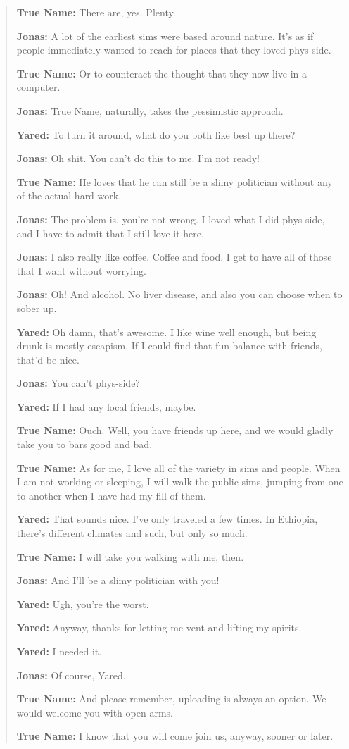 \begin{quote}
\textbf{True Name:} There are, yes. Plenty.

\textbf{Jonas:} A lot of the earliest sims were based around nature. It's as if people immediately wanted to reach for places that they loved phys-side.

\textbf{True Name:} Or to counteract the thought that they now live in a computer.

\textbf{Jonas:} True Name, naturally, takes the pessimistic approach.

\textbf{Yared:} To turn it around, what do you both like best up there?

\textbf{Jonas:} Oh shit. You can't do this to me. I'm not ready!

\textbf{True Name:} He loves that he can still be a slimy politician without any of the actual hard work.

\textbf{Jonas:} The problem is, you're not wrong. I loved what I did phys-side, and I have to admit that I still love it here.

\textbf{Jonas:} I also really like coffee. Coffee and food. I get to have all of those that I want without worrying.

\textbf{Jonas:} Oh! And alcohol. No liver disease, and also you can choose when to sober up.

\textbf{Yared:} Oh damn, that's awesome. I like wine well enough, but being drunk is mostly escapism. If I could find that fun balance with friends, that'd be nice.

\textbf{Jonas:} You can't phys-side?

\textbf{Yared:} If I had any local friends, maybe.

\textbf{True Name:} Ouch. Well, you have friends up here, and we would gladly take you to bars good and bad.

\textbf{True Name:} As for me, I love all of the variety in sims and people. When I am not working or sleeping, I will walk the public sims, jumping from one to another when I have had my fill of them.

\textbf{Yared:} That sounds nice. I've only traveled a few times. In Ethiopia, there's different climates and such, but only so much.

\textbf{True Name:} I will take you walking with me, then.

\textbf{Jonas:} And I'll be a slimy politician with you!

\textbf{Yared:} Ugh, you're the worst.

\textbf{Yared:} Anyway, thanks for letting me vent and lifting my spirits.

\textbf{Yared:} I needed it.

\textbf{Jonas:} Of course, Yared.

\textbf{True Name:} And please remember, uploading is always an option. We would welcome you with open arms.

\textbf{True Name:} I know that you will come join us, anyway, sooner or later.
\end{quote}
